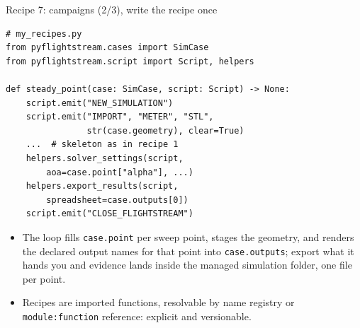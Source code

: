 \documentclass[aspectratio=169,10pt]{beamer}
\newcommand{\code}[1]{\texttt{\small #1}}
\begin{document}
\begin{frame}[fragile]{Recipe 7: campaigns (2/3), write the recipe once}
\begin{lstlisting}
# my_recipes.py
from pyflightstream.cases import SimCase
from pyflightstream.script import Script, helpers

def steady_point(case: SimCase, script: Script) -> None:
    script.emit("NEW_SIMULATION")
    script.emit("IMPORT", "METER", "STL",
                str(case.geometry), clear=True)
    ...  # skeleton as in recipe 1
    helpers.solver_settings(script,
        aoa=case.point["alpha"], ...)
    helpers.export_results(script,
        spreadsheet=case.outputs[0])
    script.emit("CLOSE_FLIGHTSTREAM")
\end{lstlisting}
  \begin{itemize}
    \item The loop fills \code{case.point} per sweep point, stages the geometry, and renders the declared output names for that point into \code{case.outputs}; export what it hands you and evidence lands inside the managed simulation folder, one file per point.
    \item Recipes are imported functions, resolvable by name registry or \code{module:function} reference: explicit and versionable.
  \end{itemize}
\end{frame}
\end{document}
